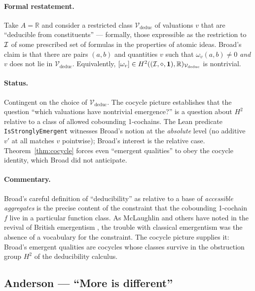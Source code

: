 \paragraph{Formal restatement.} Take $A = \mathbb{R}$ and consider a
restricted class $\mathcal V_{\mathrm{deduc}}$ of valuations $v$ that are
``deducible from constituents'' --- formally, those expressible as the
restriction to $\mathcal{I}$ of some prescribed set of formulas in the
properties of atomic ideas. Broad's claim is that there are pairs $(a, b)$
and quantities $v$ such that $\omega_v(a, b) \ne 0$ \emph{and} $v$ does
not lie in $\mathcal V_{\mathrm{deduc}}$. Equivalently, $[\omega_v] \in
H^2((\mathcal{I},\mathbin{\diamond},\mathbf{1}), \mathbb{R})_{\mathcal V_{\mathrm{deduc}}}$ is nontrivial.

\paragraph{Status.} Contingent on the choice of $\mathcal
V_{\mathrm{deduc}}$. The cocycle picture establishes that the question
``which valuations have nontrivial emergence?'' is a question about
$H^2$ relative to a class of allowed cobounding 1-cochains. The Lean
predicate \texttt{IsStronglyEmergent} witnesses Broad's notion at the
\emph{absolute} level (no additive $v'$ at all matches $v$ pointwise);
Broad's interest is the relative case. Theorem~\ref{thm:cocycle} forces
even ``emergent qualities'' to obey the cocycle identity, which Broad did
not anticipate.

\paragraph{Commentary.} Broad's careful definition of ``deducibility'' as
relative to a base of \emph{accessible aggregates} is the precise content of
the constraint that the cobounding 1-cochain $f$ live in a particular
function class. As McLaughlin and others have noted in the revival of
British emergentism \cite{Anderson1972}, the trouble with classical
emergentism was the absence of a vocabulary for the constraint. The cocycle
picture supplies it: Broad's emergent qualities are cocycles whose
classes survive in the obstruction group $H^2$ of the deducibility
calculus.

\subsection{Anderson --- ``More is different''}\label{sec:zoo:anderson}

